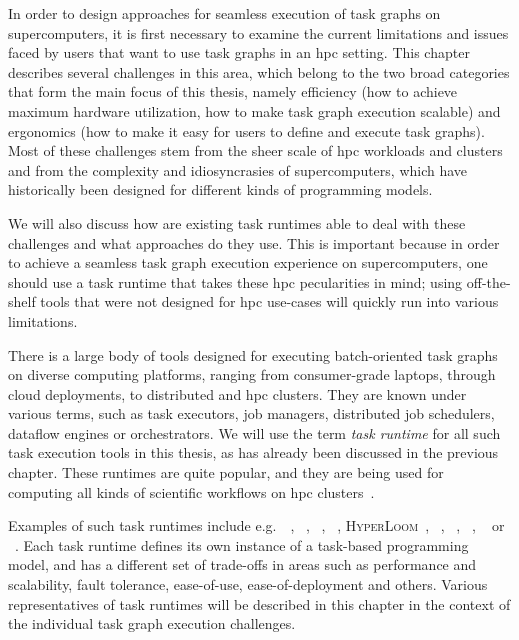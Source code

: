 In order to design approaches for seamless execution of task graphs on supercomputers, it is first
necessary to examine the current limitations and issues faced by users that want to use task graphs
in an \gls{hpc} setting. This chapter describes several challenges in this area, which
belong to the two broad categories that form the main focus of this thesis, namely efficiency (how
to achieve maximum hardware utilization, how to make task graph execution scalable) and ergonomics
(how to make it easy for users to define and execute task graphs). Most of these challenges stem
from the sheer scale of \gls{hpc} workloads and clusters and from the complexity and
idiosyncrasies of supercomputers, which have historically been designed for different kinds of
programming models.

We will also discuss how are existing task runtimes able to deal with these challenges and what
approaches do they use. This is important because in order to achieve a seamless task graph
execution experience on supercomputers, one should use a task runtime that takes these
\gls{hpc} pecularities in mind; using off-the-shelf tools that were not designed for
\gls{hpc} use-cases will quickly run into various limitations.

There is a large body of tools designed for executing batch-oriented task graphs on diverse
computing platforms, ranging from consumer-grade laptops, through cloud deployments, to distributed
and \gls{hpc} clusters. They are known under various terms, such as task executors,
job managers, distributed job schedulers, dataflow engines or orchestrators. We will use the term
\emph{task runtime} for all such task execution tools in this thesis, as has already been
discussed in the previous chapter. These runtimes are quite popular, and they are being used for
computing all kinds of scientific workflows on \gls{hpc}
clusters~\cite{hpc_tasks, hpc_tasks_2, hpc_tasks_3, pegasus}.

Examples of such task runtimes include e.g.\ \dask~\cite{dask},
\parsl~\cite{parsl}, \ray~\cite{ray},
\pycompss~\cite{pycompss}, \textsc{HyperLoom}~\cite{hyperloom},
\gnuparallel~\cite{parallel}, \snakemake~\cite{snakemake},
\merlin~\cite{merlin},
\autosubmit~\cite{autosubmit} or \fireworks~\cite{fireworks}. Each task runtime
defines its own instance of a task-based programming model, and has a different set of trade-offs
in areas such as performance and scalability, fault tolerance, ease-of-use, ease-of-deployment and
others. Various representatives of task runtimes will be described in this chapter in the context
of the individual task graph execution challenges.

